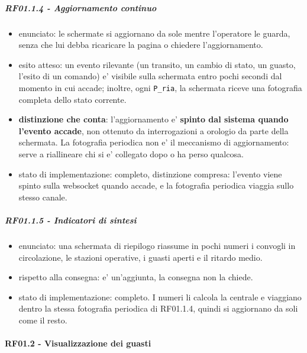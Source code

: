 \documentclass[11pt]{article}
\begin{document}
\subparagraph{RF01.1.4 - Aggiornamento continuo}
\label{sec:org8037588}
\begin{itemize}
\item enunciato: le schermate si aggiornano da sole mentre l'operatore le guarda, senza che lui debba
ricaricare la pagina o chiedere l'aggiornamento.
\item esito atteso: un evento rilevante (un transito, un cambio di stato, un guasto, l'esito di un
comando) e' visibile sulla schermata entro pochi secondi dal momento in cui accade; inoltre, ogni
\texttt{P\_ria}, la schermata riceve una fotografia completa dello stato corrente.
\item \textbf{distinzione che conta}: l'aggiornamento e' \textbf{spinto dal sistema quando l'evento accade}, non
ottenuto da interrogazioni a orologio da parte della schermata. La fotografia periodica non e' il
meccanismo di aggiornamento: serve a riallineare chi si e' collegato dopo o ha perso qualcosa.
\item stato di implementazione: completo, distinzione compresa: l'evento viene spinto sulla websocket
quando accade, e la fotografia periodica viaggia sullo stesso canale.
\end{itemize}
\subparagraph{RF01.1.5 - Indicatori di sintesi}
\label{sec:orgc3d03bf}
\begin{itemize}
\item enunciato: una schermata di riepilogo riassume in pochi numeri i convogli in circolazione, le
stazioni operative, i guasti aperti e il ritardo medio.
\item rispetto alla consegna: e' un'aggiunta, la consegna non la chiede.
\item stato di implementazione: completo. I numeri li calcola la centrale e viaggiano dentro la stessa
fotografia periodica di RF01.1.4, quindi si aggiornano da soli come il resto.
\end{itemize}
\paragraph{RF01.2 - Visualizzazione dei guasti}
\label{sec:orgc34c1bc}
\end{document}
